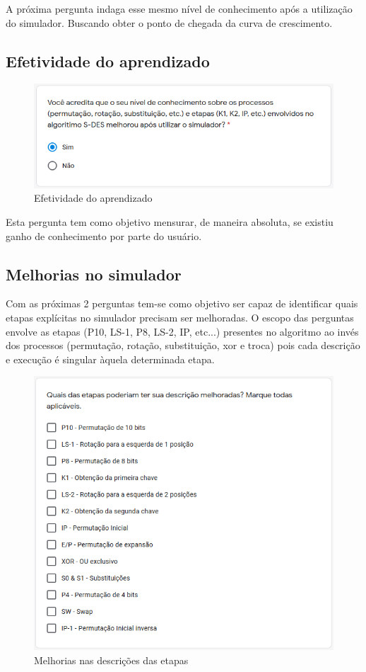 A próxima pergunta indaga esse mesmo nível de conhecimento após a utilização do simulador. Buscando obter o ponto de chegada da curva de crescimento.

\subsection{Efetividade do aprendizado}

\begin{figure}[H]
    \centering
    \caption{Efetividade do aprendizado}
    \includegraphics[width=0.75\linewidth]{Questionario/Q4.png}
\end{figure}

Esta pergunta tem como objetivo mensurar, de maneira absoluta, se existiu ganho de conhecimento por parte do usuário.

\subsection{Melhorias no simulador}

Com as próximas 2 perguntas tem-se como objetivo ser capaz de identificar quais etapas explícitas no simulador precisam ser melhoradas. O escopo das perguntas envolve as etapas (P10, LS-1, P8, LS-2, IP, etc...) presentes no algoritmo ao invés dos processos (permutação, rotação, substituição, xor e troca) pois cada descrição e execução é singular àquela determinada etapa.

\begin{figure}[H]
    \centering
    \caption{Melhorias nas descrições das etapas}
    \includegraphics[width=0.7\linewidth]{Questionario/Q5.png}
\end{figure}

